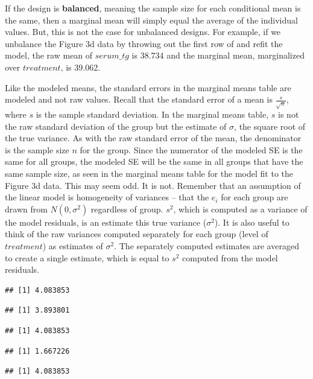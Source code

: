 \documentclass[]{book}
\begin{document}
If the design is \textbf{balanced}, meaning the sample size for each conditional mean is the same, then a marginal mean will simply equal the average of the individual values. But, this is not the case for unbalanced designs. For example, if we unbalance the Figure 3d data by throwing out the first row of and refit the model, the raw mean of \(serum\_tg\) is 38.734 and the marginal mean, marginalized over \(treatment\), is 39.062.

Like the modeled means, the standard errors in the marginal means table are modeled and not raw values. Recall that the standard error of a mean is \(\frac{s}{\sqrt{n}}\), where \(s\) is the sample standard deviation. In the marginal means table, \(s\) is not the raw standard deviation of the group but the estimate of \(\sigma\), the square root of the true variance. As with the raw standard error of the mean, the denominator is the sample size \(n\) for the group. Since the numerator of the modeled SE is the same for all groups, the modeled SE will be the same in all groups that have the same sample size, as seen in the marginal means table for the model fit to the Figure 3d data. This may seem odd. It is not. Remember that an assumption of the linear model is homogeneity of variances -- that the \(e_i\) for each group are drawn from \(N(0, \sigma^2)\) regardless of group. \(s^2\), which is computed as a variance of the model residuals, is an estimate this true variance (\(\sigma^2\)). It is also useful to think of the raw variances computed separately for each group (level of \(treatment\)) as estimates of \(\sigma^2\). The separately computed estimates are averaged to create a single estimate, which is equal to \(s^2\) computed from the model residuals.

\begin{verbatim}
## [1] 4.083853
\end{verbatim}

\begin{verbatim}
## [1] 3.893801
\end{verbatim}

\begin{verbatim}
## [1] 4.083853
\end{verbatim}

\begin{verbatim}
## [1] 1.667226
\end{verbatim}

\begin{verbatim}
## [1] 4.083853
\end{verbatim}
\end{document}

